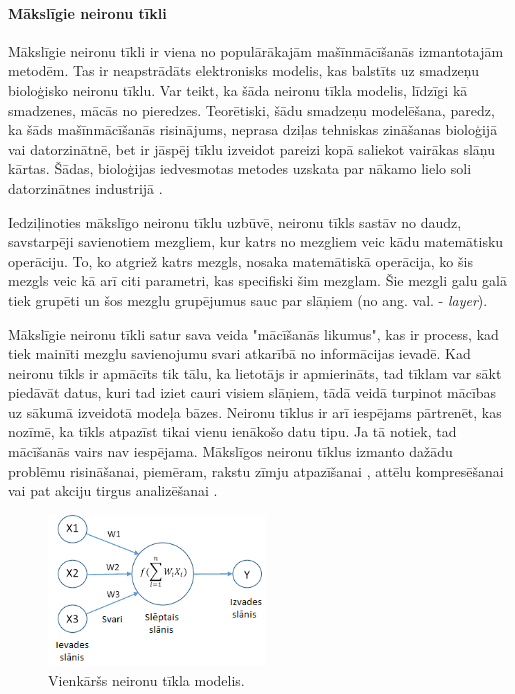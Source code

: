 \paragraph{Mākslīgie neironu tīkli}
\hfill\par
Mākslīgie neironu tīkli ir viena no populārākajām mašīnmācīšanās izmantotajām metodēm. Tas ir neapstrādāts elektronisks modelis, kas balstīts uz smadzeņu bioloģisko neironu tīklu. Var teikt, ka šāda neironu tīkla modelis, līdzīgi kā smadzenes, mācās no pieredzes. Teorētiski, šādu smadzeņu modelēšana, paredz, ka šāds mašīnmācīšanās risinājums, neprasa dziļas tehniskas zināšanas bioloģijā vai datorzinātnē, bet ir jāspēj tīklu izveidot pareizi kopā saliekot vairākas slāņu kārtas. Šādas, bioloģijas iedvesmotas metodes uzskata par nākamo lielo soli datorzinātnes industrijā \cite{staff}. \par
Iedziļinoties mākslīgo neironu tīklu uzbūvē, neironu tīkls sastāv no daudz, savstarpēji savienotiem mezgliem, kur katrs no mezgliem veic kādu matemātisku operāciju. To, ko atgriež katrs mezgls, nosaka matemātiskā operācija, ko šis mezgls veic kā arī citi parametri, kas specifiski šim mezglam. Šie mezgli galu galā tiek grupēti un šos mezglu grupējumus sauc par slāņiem (no ang. val. - \textit{layer}). \par
Mākslīgie neironu tīkli satur sava veida "mācīšanās likumus", kas ir process, kad tiek mainīti mezglu savienojumu svari atkarībā no informācijas ievadē. 
Kad neironu tīkls ir apmācīts tik tālu, ka lietotājs ir apmierināts, tad tīklam var sākt piedāvāt datus, kuri tad iziet cauri visiem slāņiem, tādā veidā turpinot mācības uz sākumā izveidotā modeļa bāzes. Neironu tīklus ir arī iespējams pārtrenēt, kas nozīmē, ka tīkls atpazīst tikai vienu ienākošo datu tipu. Ja tā notiek, tad mācīšanās vairs nav iespējama. Mākslīgos neironu tīklus izmanto dažādu problēmu risināšanai, piemēram, rakstu zīmju atpazīšanai \cite{nnchars}, attēlu kompresēšanai \cite{dony1995neural} vai pat akciju tirgus analizēšanai \cite{kimoto1990stock}.

\begin{figure}[H]%
	\centering
	\includegraphics[height=4cm]{images/neironutikls.png} %
	\caption{Vienkāršs neironu tīkla modelis.}%
	\label{fig:example}%
\end{figure}

